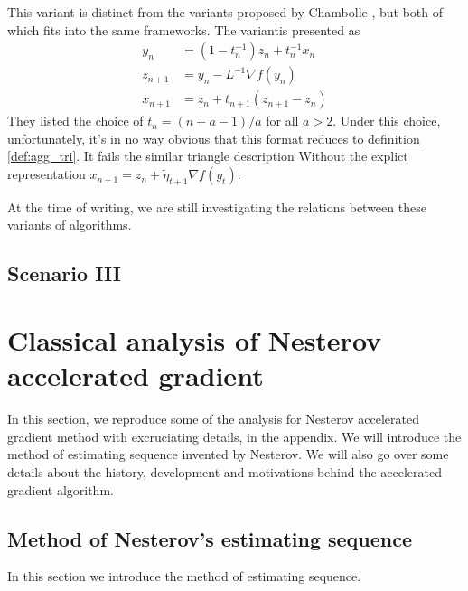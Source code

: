 \documentclass[12pt]{article}
\begin{document}
        \begin{remark}
            This variant is distinct from the variants proposed by Chambolle \cite{chambolle_convergence_2015}, but both of which fits into the same frameworks. 
            The variantis presented as 
            \begin{align*}
                y_n &= (1 - t_n^{-1})z_n + t_n^{-1} x_n
                \\
                z_{n + 1} &= y_n - L^{-1}\nabla f(y_n)
                \\
                x_{n + 1} &= z_n + t_{n + 1}(z_{n + 1} - z_n)
            \end{align*}
            They listed the choice of $t_n = (n + a - 1)/a$ for all $a > 2$. 
            Under this choice, unfortunately, it's in no way obvious that this format reduces to \hyperref[def:agg_tri]{definition \ref*{def:agg_tri}}. 
            It fails the similar triangle description Without the explict representation $x_{n + 1} = z_n + \tilde\eta_{t + 1}\nabla f(y_t)$. 
            \par\noindent
            At the time of writing, we are still investigating the relations between these variants of algorithms.
        \end{remark}
        
    \subsection{Scenario III}
    


\section{Classical analysis of Nesterov accelerated gradient}
    In this section, we reproduce some of the analysis for Nesterov accelerated gradient method with excruciating details, in the appendix. 
    We will introduce the method of estimating sequence invented by Nesterov. 
    We will also go over some details about the history, development and motivations behind the accelerated gradient algorithm. 
    \subsection{Method of Nesterov's estimating sequence}
        In this section we introduce the method of estimating sequence. 
\end{document}
